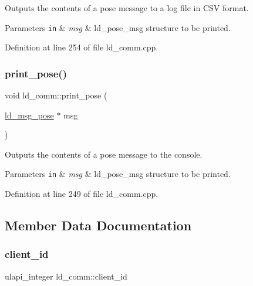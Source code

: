 Outputs the contents of a pose message to a log file in C\+SV format. 
\begin{DoxyParams}[1]{Parameters}
\mbox{\tt in}  & {\em msg} & ld\+\_\+pose\+\_\+msg structure to be printed. \\
\hline
\end{DoxyParams}


Definition at line 254 of file ld\+\_\+comm.\+cpp.

\mbox{\label{classld__comm_aceb15ae4635e8033ec46cb1a54a99c1f}} 
\subsubsection{\texorpdfstring{print\+\_\+pose()}{print\_pose()}}
{\footnotesize\ttfamily void ld\+\_\+comm\+::print\+\_\+pose (\begin{DoxyParamCaption}\item[{\mbox{\hyperlink{structld__msg__pose}{ld\+\_\+msg\+\_\+pose}} $\ast$}]{msg }\end{DoxyParamCaption})}

Outputs the contents of a pose message to the console. 
\begin{DoxyParams}[1]{Parameters}
\mbox{\tt in}  & {\em msg} & ld\+\_\+pose\+\_\+msg structure to be printed. \\
\hline
\end{DoxyParams}


Definition at line 249 of file ld\+\_\+comm.\+cpp.



\subsection{Member Data Documentation}
\mbox{\label{classld__comm_ab48ea91f4f13b276a1e65fe5edd1ab15}} 
\subsubsection{\texorpdfstring{client\+\_\+id}{client\_id}}
{\footnotesize\ttfamily ulapi\+\_\+integer ld\+\_\+comm\+::client\+\_\+id\hspace{0.3cm}{\ttfamily [private]}}

